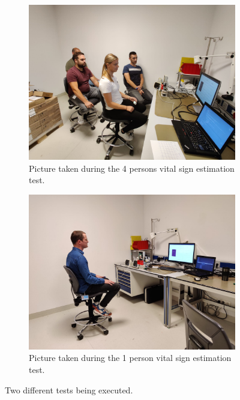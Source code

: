 \begin{figure}[t]
\begin{subfigure}{.45\textwidth}
  \centering
  \includegraphics[width=\linewidth]{figures/validation/layout_4pers.jpeg}  
  \caption{Picture taken during the 4 persons vital sign estimation test.}
  \label{fig:test_setup_4_pic}
\end{subfigure}
\begin{subfigure}{.45\textwidth}
  \centering
  \includegraphics[width=\linewidth]{figures/validation/layout_michiel.jpeg}  
  \caption{Picture taken during the 1 person vital sign estimation test.}
  \label{fig:test_setup_1_pic}
\end{subfigure}
\caption{Two different tests being executed.}
\label{fig:test_setup_pic}
\end{figure}

